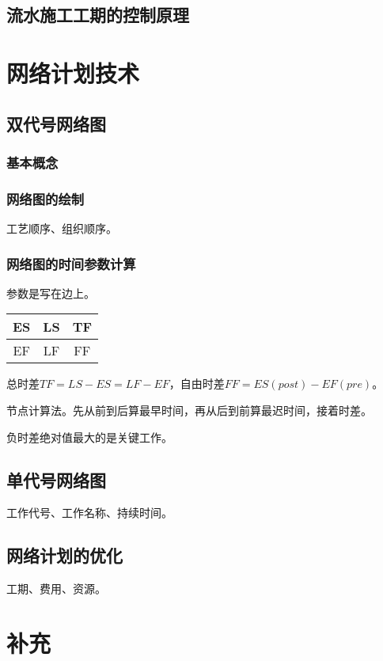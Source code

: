 \documentclass{book}
\begin{document}
\section{流水施工工期的控制原理}
\chapter{网络计划技术}
\section{双代号网络图}
\subsection{基本概念}
\subsection{网络图的绘制}
\par 工艺顺序、组织顺序。
\subsection{网络图的时间参数计算}
\par 参数是写在边上。
\begin{table}[htbp]
    \centering
    \begin{tabular}{c|c|c}
        ES & LS & TF \\
        \hline
        EF & LF & FF
    \end{tabular}
\end{table}
\par 总时差$TF=LS-ES=LF-EF$，自由时差$FF=ES(post)-EF(pre)$。
\par 节点计算法。先从前到后算最早时间，再从后到前算最迟时间，接着时差。
\par 负时差绝对值最大的是关键工作。
\section{单代号网络图}
\par 工作代号、工作名称、持续时间。
\section{网络计划的优化}
\par 工期、费用、资源。
\appendix
\chapter{补充}
\end{document}
